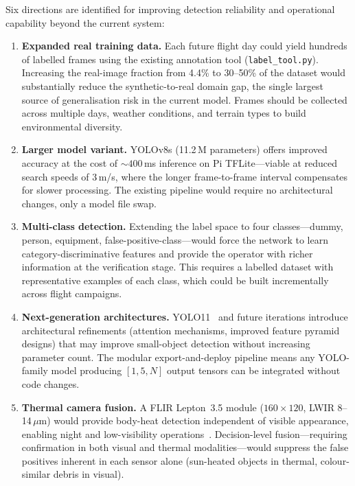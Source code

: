 Six directions are identified for improving detection reliability and operational capability beyond the current system:

\begin{enumerate}
    \item \textbf{Expanded real training data.}  Each future flight day could yield hundreds of labelled frames using the existing annotation tool (\texttt{label\_tool.py}).  Increasing the real-image fraction from 4.4\% to 30--50\% of the dataset would substantially reduce the synthetic-to-real domain gap, the single largest source of generalisation risk in the current model.  Frames should be collected across multiple days, weather conditions, and terrain types to build environmental diversity.

    \item \textbf{Larger model variant.}  YOLOv8s (11.2\,M parameters) offers improved accuracy at the cost of ${\sim}400$\,ms inference on Pi TFLite---viable at reduced search speeds of 3\,m/s, where the longer frame-to-frame interval compensates for slower processing.  The existing pipeline would require no architectural changes, only a model file swap.

    \item \textbf{Multi-class detection.}  Extending the label space to four classes---dummy, person, equipment, false-positive-class---would force the network to learn category-discriminative features and provide the operator with richer information at the verification stage.  This requires a labelled dataset with representative examples of each class, which could be built incrementally across flight campaigns.

    \item \textbf{Next-generation architectures.}  YOLO11~\cite{yolov8} and future iterations introduce architectural refinements (attention mechanisms, improved feature pyramid designs) that may improve small-object detection without increasing parameter count.  The modular export-and-deploy pipeline means any YOLO-family model producing $[1,5,N]$ output tensors can be integrated without code changes.

    \item \textbf{Thermal camera fusion.}  A FLIR Lepton~3.5 module ($160\times120$, LWIR 8--14\,$\mu$m) would provide body-heat detection independent of visible appearance, enabling night and low-visibility operations~\cite{rudol2008human}.  Decision-level fusion---requiring confirmation in both visual and thermal modalities---would suppress the false positives inherent in each sensor alone (sun-heated objects in thermal, colour-similar debris in visual).


\end{enumerate}
